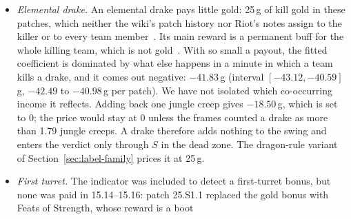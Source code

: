 \begin{itemize}
\item \emph{Elemental drake.} An elemental drake pays little gold: 25\,g of kill gold in these
  patches, which neither the wiki's patch history nor Riot's notes assign to the killer or to every
  team member~\cite{lolwiki2026dragonpit,riot2026patch261}. Its main reward is a permanent buff for the
  whole killing team, which is not gold~\cite{lolwiki2026dragonslayer}. With so small a payout, the fitted
  coefficient is dominated by what else happens in a minute in which a team kills a drake, and it comes
  out negative: $-41.83$\,g (interval $[-43.12, -40.59]$\,g, $-42.49$ to $-40.98$\,g per patch). We have
  not isolated which co-occurring income it reflects. Adding back one jungle creep gives $-18.50$\,g,
  which is set to 0; the price would stay at 0 unless the frames counted a drake as more than 1.79
  jungle creeps. A drake therefore adds nothing to the swing and enters the verdict only through $S$
  in the dead zone. The dragon-rule variant of Section~\ref{sec:label-family} prices it at 25\,g.
\item \emph{First turret.} The indicator was included to detect a first-turret bonus, but none was paid
  in 15.14--15.16: patch 25.S1.1 replaced the gold bonus with Feats of Strength, whose reward is a boot

\end{itemize}
